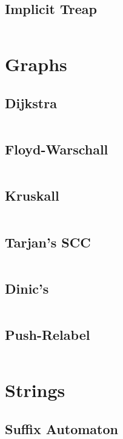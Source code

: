 \documentclass[8pt,a4paper,landscape,oneside]{amsart}
\begin{document}
\begin{multicols*}{2}
\begin{multicols*}{2}
		\subsection{Implicit Treap}
		\inputminted[firstline=16,lastline=57]{c++}{_code/datastructures/implicit_treap.cpp}
		\vfill\null
		\columnbreak
		\vfill\null
	\end{multicols*}
	\section{Graphs}
	\begin{multicols*}{2}
		\subsection{Dijkstra}
		\inputminted[firstline=21,lastline=32]{c++}{_code/graphs/dijkstra.cpp}
		\subsection{Floyd-Warschall}
		\inputminted[firstline=17,lastline=21]{c++}{_code/graphs/floyd_warschall.cpp}
		\subsection{Kruskall}
		\inputminted[firstline=27,lastline=36]{c++}{_code/graphs/kruskall.cpp}
		\vfill\null
		\columnbreak
		\subsection{Tarjan's SCC}
		\inputminted[firstline=27,lastline=39]{c++}{_code/graphs/scc.cpp}
		\subsection{Dinic's}
		\inputminted[firstline=11,lastline=29]{c++}{_code/graphs/dinic.cpp}
		\subsection{Push-Relabel}
		\inputminted[firstline=11,lastline=25]{c++}{_code/graphs/pushrelabel.cpp}
		\vfill\null
	\end{multicols*}
	\vfill\null
	\newpage
	\section{Strings}
	\begin{multicols*}{2}
		\subsection{Suffix Automaton}
		\inputminted[firstline=16,lastline=43]{c++}{_code/strings/suffixAutomaton.cpp}
		\vfill\null
		\columnbreak
		\vfill\null
	\end{multicols*}
	\vfill\null

\end{multicols*}
\end{document}
